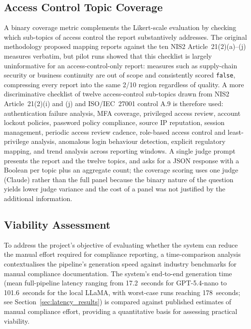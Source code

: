 \documentclass[]{UCD_CS_FYP_Report}
\begin{document}
\subsection{Access Control Topic Coverage}
\label{sec:access_control_coverage}
 
A binary coverage metric complements the Likert-scale evaluation by checking which sub-topics of access control the report substantively addresses. The original methodology proposed mapping reports against the ten NIS2 Article~21(2)(a)--(j) measures verbatim, but pilot runs showed that this checklist is largely uninformative for an access-control-only report: measures such as supply-chain security or business continuity are out of scope and consistently scored \texttt{false}, compressing every report into the same 2/10 region regardless of quality. A more discriminative checklist of twelve access-control sub-topics drawn from NIS2 Article~21(2)(i) and (j) and ISO/IEC~27001 control A.9 is therefore used: authentication failure analysis, MFA coverage, privileged access review, account lockout policies, password policy compliance, source IP reputation, session management, periodic access review cadence, role-based access control and least-privilege analysis, anomalous login behaviour detection, explicit regulatory mapping, and trend analysis across reporting windows. A single judge prompt presents the report and the twelve topics, and asks for a JSON response with a Boolean per topic plus an aggregate count; the coverage scoring uses one judge (Claude) rather than the full panel because the binary nature of the question yields lower judge variance and the cost of a panel was not justified by the additional information.
 
\subsection{Viability Assessment}
\label{sec:viability_assessment}
 
To address the project's objective of evaluating whether the system can reduce the manual effort required for compliance reporting, a time-comparison analysis contextualises the pipeline's generation speed against industry benchmarks for manual compliance documentation. The system's end-to-end generation time (mean full-pipeline latency ranging from 17.2~seconds for GPT-5.4-nano to 101.6~seconds for the local LLaMA, with worst-case runs reaching 178~seconds; see Section~\ref{sec:latency_results}) is compared against published estimates of manual compliance effort, providing a quantitative basis for assessing practical viability.
\end{document}
